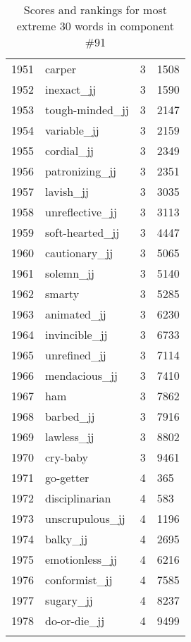 \begin{longtable}[!htbp]{| rlr@{.}l |}
    1951 & carper & 3 & 1508 \\
    1952 & inexact\_jj & 3 & 1590 \\
    1953 & tough-minded\_jj & 3 & 2147 \\
    1954 & variable\_jj & 3 & 2159 \\
    1955 & cordial\_jj & 3 & 2349 \\
    1956 & patronizing\_jj & 3 & 2351 \\
    1957 & lavish\_jj & 3 & 3035 \\
    1958 & unreflective\_jj & 3 & 3113 \\
    1959 & soft-hearted\_jj & 3 & 4447 \\
    1960 & cautionary\_jj & 3 & 5065 \\
    1961 & solemn\_jj & 3 & 5140 \\
    1962 & smarty & 3 & 5285 \\
    1963 & animated\_jj & 3 & 6230 \\
    1964 & invincible\_jj & 3 & 6733 \\
    1965 & unrefined\_jj & 3 & 7114 \\
    1966 & mendacious\_jj & 3 & 7410 \\
    1967 & ham & 3 & 7862 \\
    1968 & barbed\_jj & 3 & 7916 \\
    1969 & lawless\_jj & 3 & 8802 \\
    1970 & cry-baby & 3 & 9461 \\
    1971 & go-getter & 4 & 365 \\
    1972 & disciplinarian & 4 & 583 \\
    1973 & unscrupulous\_jj & 4 & 1196 \\
    1974 & balky\_jj & 4 & 2695 \\
    1975 & emotionless\_jj & 4 & 6216 \\
    1976 & conformist\_jj & 4 & 7585 \\
    1977 & sugary\_jj & 4 & 8237 \\
    1978 & do-or-die\_jj & 4 & 9499 \\
    \hline
    \caption{Scores and rankings for most extreme 30 words in component \#91} \\
\end{longtable}
